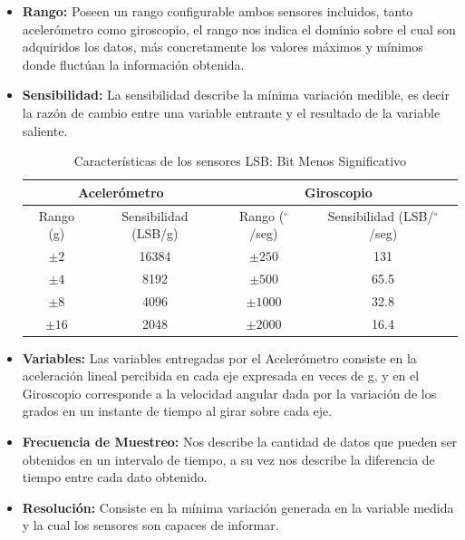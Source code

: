 \documentclass[12pt,a4paper]{article}
\newcommand{\grad}{$^{\circ}$}
\begin{document}
\begin{itemize}
	
	\item \textbf{Rango:} Poseen un rango configurable ambos sensores incluidos, tanto acelerómetro como giroscopio, el rango nos indica el dominio sobre el cual son adquiridos los datos, más concretamente los valores máximos y mínimos donde fluctúan la información obtenida.
	
	\item \textbf{Sensibilidad:} La sensibilidad describe la mínima variación medible, es decir la razón de cambio entre una variable entrante y el resultado de la variable saliente.
	
	\begin{table}[H]
		\centering
		\label{table:caracteristicasSensor}
		\begin{tabular}{|c|c|c|c|}
			\hline
			\multicolumn{2}{|c|}{Acelerómetro} &\multicolumn{2}{|c|}{Giroscopio}   \\
			\hline
			Rango (g)        & Sensibilidad (LSB/g)  & Rango (\grad/seg)     & Sensibilidad (LSB/\grad/seg)\\ \hline
			$\pm 2$     &  16384 & $\pm 250 $  	& 	131      	\\ 
			$\pm 4$     &  8192  & $\pm 500 $ 	& 	65.5     	\\
			$\pm 8$     &  4096  & $\pm 1000$  	& 	32.8       	\\
			$\pm 16$    &  2048  & $\pm 2000$   & 	16.4      	\\ 
			\hline
		\end{tabular}
		\caption{Características de los sensores LSB: Bit Menos Significativo}
	\end{table}
	
	\item \textbf{Variables:} Las variables entregadas por el Acelerómetro consiste en la aceleración lineal percibida en cada eje expresada en veces de g, y en el Giroscopio corresponde  a la velocidad angular dada por la variación de los grados en un instante de tiempo al girar sobre cada eje.
	
	\item \textbf{Frecuencia de Muestreo:} Nos describe la cantidad de datos que pueden ser obtenidos en un intervalo de tiempo, a su vez nos describe la diferencia de tiempo entre cada dato obtenido.
	
	\item \textbf{Resolución:} Consiste en la mínima variación generada en la variable medida y la cual los sensores son capaces de informar.
	

\end{itemize}
\end{document}
